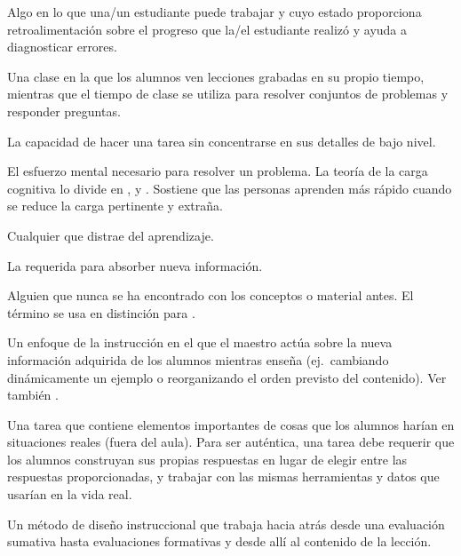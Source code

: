 \begin{description}
 Algo en lo que una/un estudiante puede trabajar 
y cuyo estado proporciona retroalimentación sobre el progreso que la/el estudiante realizó
y ayuda a diagnosticar errores.

 Una clase en la que los alumnos 
ven lecciones grabadas en su propio tiempo, mientras que el tiempo de clase 
se utiliza para resolver conjuntos de problemas y responder preguntas.

 La capacidad de hacer una tarea sin 
concentrarse en sus detalles de bajo nivel.

 El esfuerzo mental necesario para resolver un problema.
La teoría de la carga cognitiva lo divide en
 ,
y .
Sostiene que las personas aprenden más rápido cuando se reduce la carga pertinente y extraña.

 Cualquier 
que distrae del aprendizaje.

 La 
requerida para absorber nueva información.

 Alguien que nunca se ha
encontrado con los conceptos o material antes. El término se usa en distinción para
.


 Un enfoque de la instrucción en el que el
maestro actúa sobre la nueva información adquirida de los alumnos mientras enseña (ej.\ cambiando
dinámicamente un ejemplo o reorganizando el orden previsto del contenido).
Ver también .

 Una tarea que contiene elementos importantes 
de cosas que los alumnos harían en situaciones reales (fuera del aula). Para 
ser auténtica, una tarea debe requerir que los alumnos construyan sus propias respuestas
en lugar de elegir entre las respuestas proporcionadas, y trabajar con las mismas 
herramientas y datos que usarían en la vida real.


 Un método de diseño instruccional que
trabaja hacia atrás desde una evaluación sumativa hasta evaluaciones formativas y desde allí
al contenido de la lección.


\end{description}
